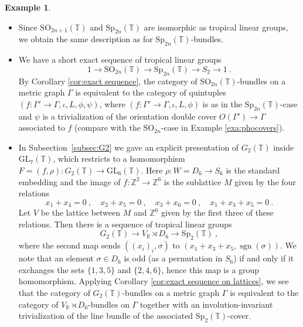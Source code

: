 \documentclass[10pt, a4paper]{amsart}
\theoremstyle{definition}
\newtheorem{example}[theorem]{Example}
\theoremstyle{myitemstyle}
\newcommand{\Z}{\mathbb{Z}}
\newcommand{\ZZ}{\mathbb{Z}}
\newcommand{\RR}{\mathbb{R}}
\newcommand{\TT}{\mathbb{T}}
\newcommand{\T}{\mathbb{T}}
\DeclareMathOperator{\sgn}{sgn}
\newcommand{\GL}{{\mathrm{GL}}}
\newcommand{\Sp}{{\mathrm{Sp}}}
\newcommand{\SO}{{\mathrm{SO}}}
\newcommand{\Ga}{\Gamma}
\begin{document}
\begin{example}
\begin{itemize}
\begin{figure}[ht]
{\begin{tikzpicture}
\end{tikzpicture}
 
  \caption{An $\Sp_4(\TT)$-bundle on a tropical elliptic curve.}
  \label{fig:sp4cover}
  }
\end{figure}
        \item[$\SO_{2n+1}$:] 
        Since $\SO_{2n+1}(\T)$ and $\Sp_{2n}(\T)$ are isomorphic as tropical linear groups, we obtain the same description as for $\Sp_{2n}(\T)$-bundles. 
        \item[$\SO_{2n}$:] We have a short exact sequence of tropical linear groups
        \[
        1 \longrightarrow 
            \SO_{2n}(\TT) \longrightarrow 
                \Sp_{2n}(\TT) \longrightarrow   
                    S_2 \longrightarrow 
                        1 \ .
        \]
        By Corollary \ref{cor:exact sequence}, the category of $\SO_{2n}(\TT)$-bundles on a metric graph $\Gamma$ is equivalent to the category of quintuples $(f:\Gamma'\to \Gamma, \iota, L, \phi, \psi)$, where $(f:\Gamma'\to \Gamma, \iota, L, \phi)$ is as in the $\Sp_{2n}(\TT)$-case and $\psi$ is a trivialization of the orientation double cover $O(\Ga')\to \Ga$ associated to $f$ (compare with the $\mathrm{SO}_{2n}$-case in Example \ref{exa:phocovers}).

        \item[$\mathrm{G}_2$:]
        In Subsection~\ref{subsec:G2} we gave an explicit presentation of $G_2(\TT)$ inside $\GL_7(\TT)$, which restricts to a homomorphism $F=(f,\rho):G_2(\TT)\to \GL_6(\TT)$. Here $\rho\colon W=D_6\to S_6$ is the standard embedding and the image of $f:\ZZ^2\to \ZZ^6$ is the sublattice $M$ given by the four relations
        \[
        x_1+x_4=0 \ ,\quad x_2+x_5=0 \ , \quad x_3+x_6=0 \ , \quad x_1+x_3+x_5=0 \ .
        \]
        Let $V$ be the lattice between $M$ and $\Z^6$ given by the first three of these relations. Then there is a sequence of tropical linear groups
        \[
        G_2(\TT) \longrightarrow V_{\RR}\rtimes D_6 \longrightarrow \Sp_2 (\TT) \ ,
        \]
        where the second map sends $((x_i)_i,\sigma)$ to $(x_1+x_3+x_5,\sgn(\sigma))$. We note that an element $\sigma\in D_6$ is odd (as a permutation in $S_6$) if and only if it exchanges the sets $\{1,3,5\}$ and $\{2,4,6\}$, hence this map is a group homomorphism. Applying Corollary \ref{cor:exact sequence on lattices}, we see that the category of $G_2(\TT)$-bundles on a metric graph $\Ga$ is equivalent to the category of $V_{\RR}\rtimes D_6$-bundles on $\Ga$ together with an involution-invariant trivialization  of the line bundle of the associated $\Sp_2(\T)$-cover.
        

\end{itemize}
\end{example}
\end{document}
